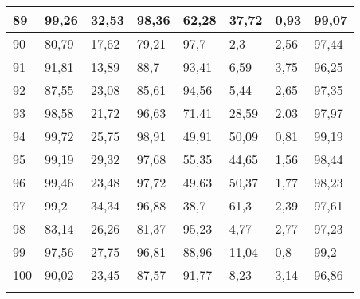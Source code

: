 \begin{longtable}[c]{|l|l|l|l|l|l|l|l|}
89              & 99,26        & 32,53        & 98,36       & 62,28         & 37,72         & 0,93          & 99,07         \\ \hline
90              & 80,79        & 17,62        & 79,21       & 97,7          & 2,3           & 2,56          & 97,44         \\ \hline
91              & 91,81        & 13,89        & 88,7        & 93,41         & 6,59          & 3,75          & 96,25         \\ \hline
92              & 87,55        & 23,08        & 85,61       & 94,56         & 5,44          & 2,65          & 97,35         \\ \hline
93              & 98,58        & 21,72        & 96,63       & 71,41         & 28,59         & 2,03          & 97,97         \\ \hline
94              & 99,72        & 25,75        & 98,91       & 49,91         & 50,09         & 0,81          & 99,19         \\ \hline
95              & 99,19        & 29,32        & 97,68       & 55,35         & 44,65         & 1,56          & 98,44         \\ \hline
96              & 99,46        & 23,48        & 97,72       & 49,63         & 50,37         & 1,77          & 98,23         \\ \hline
97              & 99,2         & 34,34        & 96,88       & 38,7          & 61,3          & 2,39          & 97,61         \\ \hline
98              & 83,14        & 26,26        & 81,37       & 95,23         & 4,77          & 2,77          & 97,23         \\ \hline
99              & 97,56        & 27,75        & 96,81       & 88,96         & 11,04         & 0,8           & 99,2          \\ \hline
100             & 90,02        & 23,45        & 87,57       & 91,77         & 8,23          & 3,14          & 96,86         \\ \hline
\label{anx:entrelazado}
\end{longtable}
